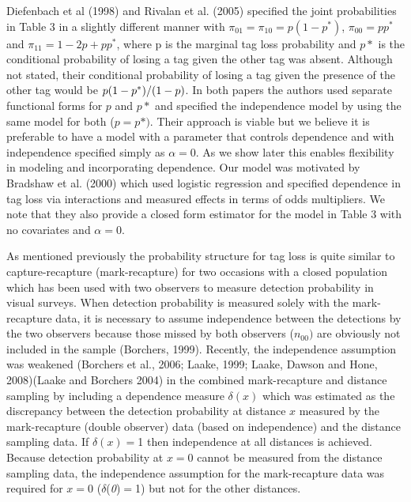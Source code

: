 \documentclass{article}
\begin{document}
Diefenbach et al (1998) and Rivalan et al. (2005) specified the joint 
probabilities in Table 3 in a slightly different manner with $\pi_{01}=\pi 
_{10}=p(1-p^{\ast })$, $\pi_{00}=pp^{\ast }$ and $\pi_{11}=1-2p+pp^{\ast 
}$, where p is the marginal tag loss probability and $p*$ is the conditional 
probability of losing a tag given the other tag was absent. Although not 
stated, their conditional probability of losing a tag given the presence of 
the other tag would be ${p(1-p^{\ast })} \mathord{\left/ {\vphantom 
{{p(1-p^{\ast })} {(1-p)}}} \right. \kern-\nulldelimiterspace} {(1-p)}$. In 
both papers the authors used separate functional forms for $p$ and $p*$ and 
specified the independence model by using the same model for both 
($p=p*)$. Their approach is viable but we believe it is preferable to have a 
model with a parameter that controls dependence and with independence 
specified simply as $\alpha =$0. As we show later this enables flexibility 
in modeling and incorporating dependence. Our model was motivated by 
Bradshaw et al. (2000) which used logistic regression and specified 
dependence in tag loss via interactions and measured effects in terms of 
odds multipliers. We note that they also provide a closed form estimator for 
the model in Table 3 with no covariates and $\alpha =$0.

As mentioned previously the probability structure for tag loss is quite 
similar to capture-recapture (mark-recapture) for two occasions with a 
closed population which has been used with two observers to measure 
detection probability in visual surveys. When detection probability is 
measured solely with the mark-recapture data, it is necessary to assume 
independence between the detections by the two observers because those 
missed by both observers ($n_{00})$ are obviously not included in the sample 
(Borchers, 1999). Recently, the independence assumption was weakened 
(Borchers et al., 2006; Laake, 1999; Laake, Dawson and Hone, 2008)(Laake and 
Borchers 2004) in the combined mark-recapture and distance sampling by 
including a dependence measure $\delta (x)$ which was estimated as the 
discrepancy between the detection probability at distance $x$ measured by the 
mark-recapture (double observer) data (based on independence) and the 
distance sampling data. If $\delta (x)=$1 then independence at all 
distances is achieved. Because detection probability at $x=$0 cannot be 
measured from the distance sampling data, the independence assumption for 
the mark-recapture data was required for $x=$0 ($\delta $(\textit{0})$=$1) but not for 
the other distances. 
\end{document}
